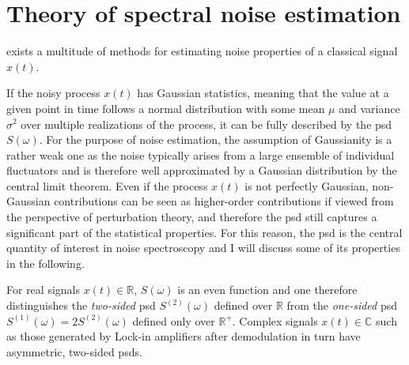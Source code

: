 \chapter{Theory of spectral noise estimation}\label{ch:speck:theory}
 exists a multitude of methods for estimating noise properties of a classical signal $x(t)$.

If the noisy process $x(t)$ has Gaussian statistics, meaning that the value at a given point in time follows a normal distribution with some mean $\mu$ and variance $\sigma^2$ over multiple realizations of the process, it can be fully described by the \gls{psd} $S(\omega)$.
For the purpose of noise estimation, the assumption of Gaussianity is a rather weak one as the noise typically arises from a large ensemble of individual fluctuators and is therefore well approximated by a Gaussian distribution by the central limit theorem.
Even if the process $x(t)$ is not perfectly Gaussian, non-Gaussian contributions can be seen as higher-order contributions if viewed from the perspective of perturbation theory, and therefore the \gls{psd} still captures a significant part of the statistical properties.
For this reason, the \gls{psd} is the central quantity of interest in noise spectroscopy and I will discuss some of its properties in the following.

For real signals $x(t) \in\mathbb{R}$, $S(\omega)$ is an even function and one therefore distinguishes the \emph{two-sided} \gls{psd} $S^{(2)}(\omega)$ defined over $\mathbb{R}$ from the \emph{one-sided} \gls{psd} $S^{(1)}(\omega) = 2 S^{(2)}(\omega)$ defined only over $\mathbb{R}^+$.
Complex signals $x(t)\in\mathbb{C}$ such as those generated by Lock-in amplifiers after demodulation in turn have asymmetric, two-sided \glspl{psd}.


